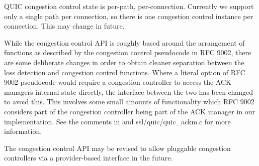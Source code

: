 QUIC congestion control state is per-\/path, per-\/connection. Currently we support only a single path per connection, so there is one congestion control instance per connection. This may change in future.

While the congestion control API is roughly based around the arrangement of functions as described by the congestion control pseudocode in RFC 9002, there are some deliberate changes in order to obtain cleaner separation between the loss detection and congestion control functions. Where a literal option of RFC 9002 pseudocode would require a congestion controller to access the ACK manager\textquotesingle{}s internal state directly, the interface between the two has been changed to avoid this. This involves some small amounts of functionality which RFC 9002 considers part of the congestion controller being part of the ACK manager in our implementation. See the comments in {\ttfamily {}} and {\ttfamily ssl/quic/quic\+\_\+ackm.\+c} for more information.

The congestion control API may be revised to allow pluggable congestion controllers via a provider-\/based interface in the future. 
